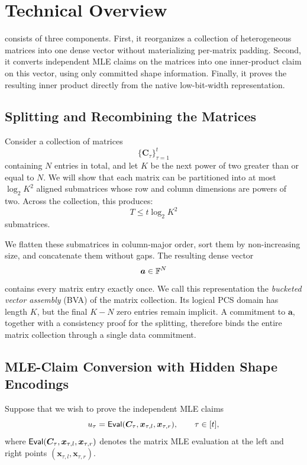 \section{Technical Overview}
\label{sec:overview}

\methodname consists of three components.  First, it reorganizes a collection
of heterogeneous matrices into one dense vector without materializing
per-matrix padding.  Second, it converts independent MLE claims on the
matrices into one inner-product claim on this vector, using only committed
shape information.  Finally, it proves the resulting inner product directly
from the native low-bit-width representation.

\subsection{Splitting and Recombining the Matrices}

Consider a collection of matrices
\[
    \{\bm C_\tau\}_{\tau=1}^{t}
\]
containing \(N\) entries in total, and let \(K\) be the next power of two
greater than or equal to \(N\).
We will show that each matrix can be partitioned into at most
\(\log_2 K^2\) aligned submatrices whose row and column dimensions are
powers of two.  Across the collection, this produces:
\[
    T\le t\log_2 K^2
\]
submatrices.

We flatten these submatrices in column-major order, sort them by non-increasing
size, and concatenate them without gaps.  The resulting dense vector
\[
    \bm a\in{\mathbb{F}}^N
\]
contains every matrix entry exactly once.  We call this representation the
\emph{bucketed vector assembly} (BVA) of the matrix collection.  Its logical
PCS domain has length \(K\), but the final \(K-N\) zero entries remain
implicit.  A commitment to \(\bm a\), together with a consistency proof for
the splitting, therefore binds the entire matrix collection through a single
data commitment.

\subsection{MLE-Claim Conversion with Hidden Shape Encodings}

Suppose that we wish to prove the independent MLE claims
\[
    u_\tau
    =
    {\sf Eval}(
        \bm C_\tau,
        \bm x_{\tau,l},
        \bm x_{\tau,r}
    ),
    \qquad \tau\in[t],
\]
where \({\sf Eval}(\bm C_\tau,\bm x_{\tau,l},\bm x_{\tau,r})\) denotes the
matrix MLE evaluation at the left and right points
\((\bm x_{\tau,l},\bm x_{\tau,r})\).

